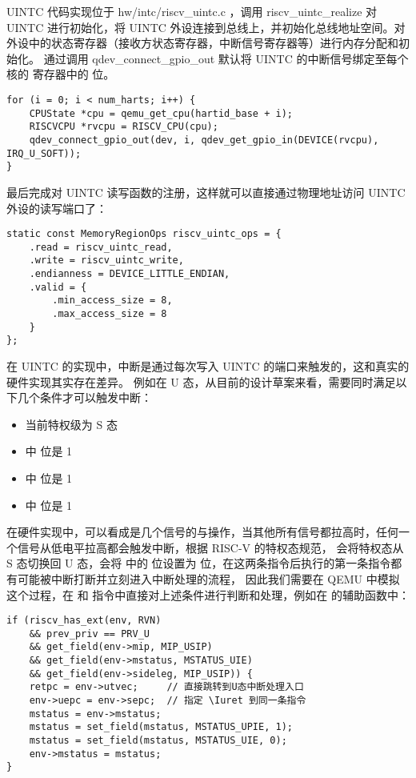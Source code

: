 UINTC 代码实现位于 hw/intc/riscv\_uintc.c ，调用 riscv\_uintc\_realize 对 UINTC 进行初始化，将 UINTC 外设连接到总线上，并初始化总线地址空间。对外设中的状态寄存器（接收方状态寄存器，中断信号寄存器等）进行内存分配和初始化。
通过调用 qdev\_connect\_gpio\_out 默认将 UINTC 的中断信号绑定至每个核的 \Ruip 寄存器中的 \FcsrUipUsip 位。

\begin{lstlisting}[style=CStyle]
for (i = 0; i < num_harts; i++) {
    CPUState *cpu = qemu_get_cpu(hartid_base + i);
    RISCVCPU *rvcpu = RISCV_CPU(cpu);
    qdev_connect_gpio_out(dev, i, qdev_get_gpio_in(DEVICE(rvcpu), IRQ_U_SOFT));
}
\end{lstlisting}

最后完成对 UINTC 读写函数的注册，这样就可以直接通过物理地址访问 UINTC 外设的读写端口了：

\begin{lstlisting}[style=CStyle]
static const MemoryRegionOps riscv_uintc_ops = {
    .read = riscv_uintc_read,
    .write = riscv_uintc_write,
    .endianness = DEVICE_LITTLE_ENDIAN,
    .valid = {
        .min_access_size = 8,
        .max_access_size = 8
    }
};
\end{lstlisting}

在 UINTC 的实现中，中断是通过每次写入 UINTC 的端口来触发的，这和真实的硬件实现其实存在差异。
例如在 U 态，从目前的设计草案来看，需要同时满足以下几个条件才可以触发中断：

\begin{itemize}
    \item 当前特权级为 S 态
    \item \Rustatus 中 \FcsrUstatusUie 位是 1
    \item \Ruie 中 \FcsrUieUsie 位是 1
    \item \Ruip 中 \FcsrUipUsip 位是 1
\end{itemize}

在硬件实现中，可以看成是几个信号的与操作，当其他所有信号都拉高时，任何一个信号从低电平拉高都会触发中断，根据 RISC-V 的特权态规范\cite{rvpriv110}，
\Isret 会将特权态从 S 态切换回 U 态，\Iuret 会将 \Rustatus 中的 \FcsrUstatusUie 位设置为 \FcsrUstatusUpie 位，在这两条指令后执行的第一条指令都有可能被中断打断并立刻进入中断处理的流程，
因此我们需要在 QEMU 中模拟这个过程，在 \Isret 和 \Iuret 指令中直接对上述条件进行判断和处理，例如在 \Isret 的辅助函数中：

\lstset{language=C}
\begin{lstlisting}[style=CStyle]
if (riscv_has_ext(env, RVN)
    && prev_priv == PRV_U
    && get_field(env->mip, MIP_USIP)
    && get_field(env->mstatus, MSTATUS_UIE)
    && get_field(env->sideleg, MIP_USIP)) {
    retpc = env->utvec;     // 直接跳转到U态中断处理入口
    env->uepc = env->sepc;  // 指定 \Iuret 到同一条指令
    mstatus = env->mstatus;
    mstatus = set_field(mstatus, MSTATUS_UPIE, 1);
    mstatus = set_field(mstatus, MSTATUS_UIE, 0);
    env->mstatus = mstatus;
}
\end{lstlisting}

